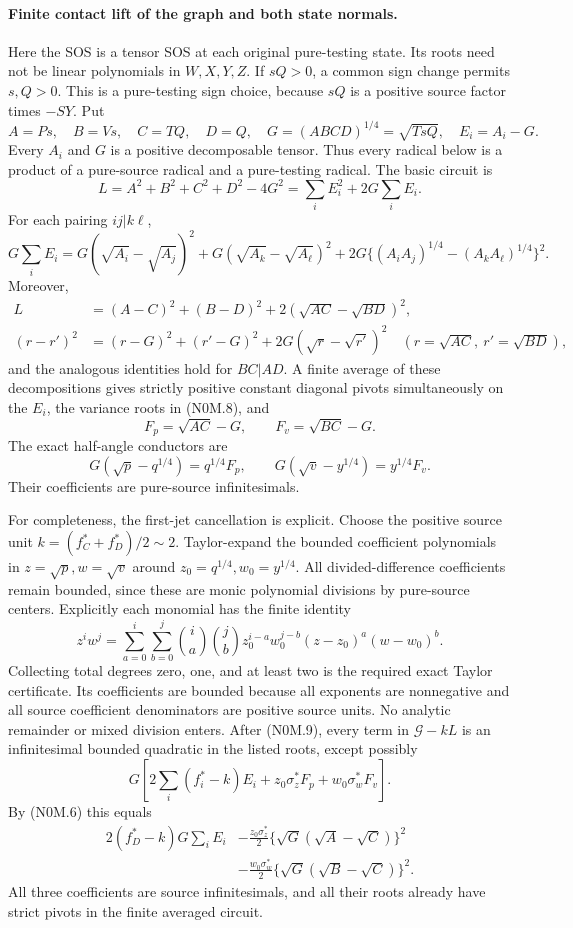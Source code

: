 \paragraph{Finite contact lift of the graph and both state normals.}
Here the SOS is a tensor SOS at each original pure-testing state. Its
roots need not be linear polynomials in $W,X,Y,Z$. If $sQ>0$, a common
sign change permits $s,Q>0$. This is a pure-testing sign choice, because
$sQ$ is a positive source factor times $-SY$. Put
\[
 A=Ps,\quad B=Vs,\quad C=TQ,\quad D=Q,
 \quad G=(ABCD)^{1/4}=\sqrt{TsQ},\quad E_i=A_i-G.
\]
Every $A_i$ and $G$ is a positive decomposable tensor. Thus every radical
below is a product of a pure-source radical and a pure-testing radical.
The basic circuit is
\[
 L=A^2+B^2+C^2+D^2-4G^2
   =\sum_iE_i^2+2G\sum_iE_i.                     \tag{N0M.8}
\]
For each pairing $ij|k\ell$,
\[
 G\sum_iE_i=G(\sqrt{A_i}-\sqrt{A_j})^2
 +G(\sqrt{A_k}-\sqrt{A_\ell})^2
 +2G\{(A_iA_j)^{1/4}-(A_kA_\ell)^{1/4}\}^2.
\]
Moreover,
\begin{align*}
 L&=(A-C)^2+(B-D)^2+2(\sqrt{AC}-\sqrt{BD})^2,\\
 (r-r')^2&=(r-G)^2+(r'-G)^2
             +2G(\sqrt r-\sqrt{r'})^2
 \quad(r=\sqrt{AC},\ r'=\sqrt{BD}),
\end{align*}
and the analogous identities hold for $BC|AD$. A finite average of
these decompositions gives strictly positive constant diagonal pivots
simultaneously on the $E_i$, the variance roots in (N0M.8), and
\[
 F_p=\sqrt{AC}-G,\qquad F_v=\sqrt{BC}-G.
\]
The exact half-angle conductors are
\[
 G(\sqrt p-q^{1/4})=q^{1/4}F_p,
 \qquad G(\sqrt v-y^{1/4})=y^{1/4}F_v.          \tag{N0M.9}
\]
Their coefficients are pure-source infinitesimals.

For completeness, the first-jet cancellation is explicit. Choose the
positive source unit $k=(f_C^*+f_D^*)/2\sim2$. Taylor-expand the bounded
coefficient polynomials in $z=\sqrt p,w=\sqrt v$ around
$z_0=q^{1/4},w_0=y^{1/4}$. All divided-difference coefficients remain
bounded, since these are monic polynomial divisions by pure-source
centers. Explicitly each monomial has the finite identity
\[
 z^iw^j=\sum_{a=0}^i\sum_{b=0}^j
 {i\choose a}{j\choose b}z_0^{i-a}w_0^{j-b}
 (z-z_0)^a(w-w_0)^b.
\]
Collecting total degrees zero, one, and at least two is the required
exact Taylor certificate. Its coefficients are bounded because all
exponents are nonnegative and all source coefficient denominators are
positive source units. No analytic remainder or mixed division enters.
After (N0M.9), every term in $\mathcal G-kL$ is an infinitesimal
bounded quadratic in the listed roots, except possibly
\[
 G\left[2\sum_i(f_i^*-k)E_i
       +z_0\sigma_z^*F_p+w_0\sigma_w^*F_v\right].
\]
By (N0M.6) this equals
\begin{align*}
 2(f_D^*-k)G\sum_iE_i
 &-\frac{z_0\sigma_z^*}{2}
       \{\sqrt G(\sqrt A-\sqrt C)\}^2\\
 &-\frac{w_0\sigma_w^*}{2}
       \{\sqrt G(\sqrt B-\sqrt C)\}^2.
\end{align*}
All three coefficients are source infinitesimals, and all their roots
already have strict pivots in the finite averaged circuit.

